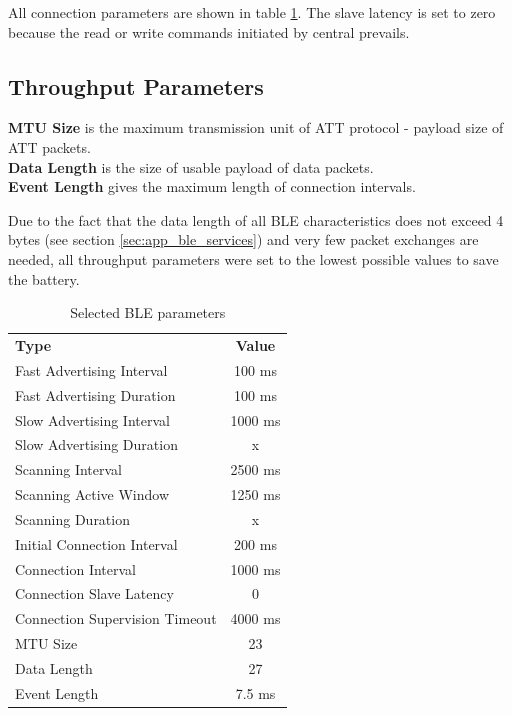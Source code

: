         All connection parameters are shown in table \ref{table:ble_parameters}. The slave latency is set to zero because the read or write commands initiated by central prevails.
        
        \subsection{Throughput Parameters}
            \textbf{MTU Size} is the maximum transmission unit of ATT protocol - payload size of ATT packets.\\
            \textbf{Data Length} is the size of usable payload of data packets.\\
            \textbf{Event Length} gives the maximum length of connection intervals. 
            
            Due to the fact that the data length of all BLE characteristics does not exceed 4 bytes (see section \ref{sec:app_ble_services}) and very few packet exchanges are needed, all throughput parameters were set to the lowest possible values to save the battery.

    \begin{table}[!ht]
        \begin{tabular}{l|c}
            \textbf{Type} & \textbf{Value} \\ 
            \Xhline{1\arrayrulewidth}
            Fast Advertising Interval & 100 ms\\
            Fast Advertising Duration & 100 ms\\
            Slow Advertising Interval & 1000 ms\\
            Slow Advertising Duration & x \\
            Scanning Interval & 2500 ms \\
            Scanning Active Window & 1250 ms \\
            Scanning Duration & x \\
            Initial Connection Interval & 200 ms\\
            Connection Interval & 1000 ms\\
            Connection Slave Latency & 0 \\
            Connection Supervision Timeout & 4000 ms\\
            MTU Size & 23\\
            Data Length & 27\\
            Event Length & 7.5 ms\\
        \end{tabular}
        \caption{Selected BLE parameters}
        \label{table:ble_parameters}
    \end{table}
        
